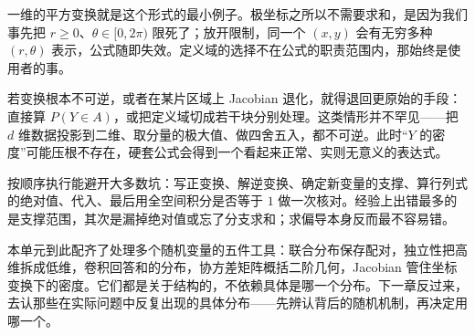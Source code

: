 一维的平方变换就是这个形式的最小例子。极坐标之所以不需要求和，是因为我们事先把 \(r\ge 0\)、\(\theta\in[0,2\pi)\) 限死了；放开限制，同一个 \((x,y)\) 会有无穷多种 \((r,\theta)\) 表示，公式随即失效。定义域的选择不在公式的职责范围内，那始终是使用者的事。

若变换根本不可逆，或者在某片区域上 Jacobian 退化，就得退回更原始的手段：直接算 \(P(Y\in A)\)，或把定义域切成若干块分别处理。这类情形并不罕见——把 \(d\) 维数据投影到二维、取分量的极大值、做四舍五入，都不可逆。此时``\(Y\) 的密度''可能压根不存在，硬套公式会得到一个看起来正常、实则无意义的表达式。

按顺序执行能避开大多数坑：写正变换、解逆变换、确定新变量的支撑、算行列式的绝对值、代入、最后用全空间积分是否等于 \(1\) 做一次核对。经验上出错最多的是支撑范围，其次是漏掉绝对值或忘了分支求和；求偏导本身反而最不容易错。

\medskip

本单元到此配齐了处理多个随机变量的五件工具：联合分布保存配对，独立性把高维拆成低维，卷积回答和的分布，协方差矩阵概括二阶几何，Jacobian 管住坐标变换下的密度。它们都是关于结构的，不依赖具体是哪一个分布。下一章反过来，去认那些在实际问题中反复出现的具体分布——先辨认背后的随机机制，再决定用哪一个。
